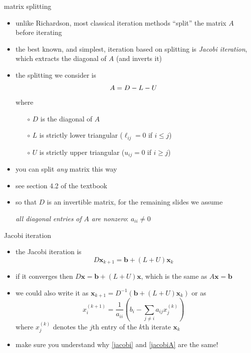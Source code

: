 \documentclass[10pt,hyperref]{beamer}
\newcommand{\bb}{\mathbf{b}}
\newcommand{\bx}{\mathbf{x}}
\begin{document}
\begin{frame}{matrix splitting}

\begin{itemize}
\item unlike Richardson, most classical iteration methods ``split'' the matrix $A$ before iterating
\item the best known, and simplest, iteration based on splitting is \emph{Jacobi iteration}, which extracts the diagonal of $A$ (and inverts it)
\item the splitting we consider is
    $$A = D - L - U \vspace{-3mm}$$
where
  \begin{itemize}
  \item[$\circ$] $D$ is the diagonal of $A$
  \item[$\circ$] $L$ is strictly lower triangular ($\ell_{ij} = 0$ if $i \le j$)
  \item[$\circ$] $U$ is strictly upper triangular ($u_{ij} = 0$ if $i \ge j$)
  \end{itemize}
\item you can split \emph{any} matrix this way
\item see section 4.2 of the textbook

\medskip
\item so that $D$ is an invertible matrix, for the remaining slides we assume

\centerline{\emph{all diagonal entries of $A$ are nonzero}: \quad  $a_{ii} \ne 0$}
\end{itemize}
\end{frame}


\begin{frame}{Jacobi iteration}

\begin{itemize}
\item the Jacobi iteration is
\begin{equation}
D \bx_{k+1} = \bb + (L + U) \bx_k  \label{jacobi}
\end{equation}
\item if it converges then $D\bx = \bb + (L+U)\bx$, which is the same as $A \bx = \bb$
\item we could also write it as \quad $\bx_{k+1} = D^{-1} \left(\bb + (L + U) \bx_k\right)$ \quad or as
\begin{equation}
x_i^{(k+1)} = \frac{1}{a_{ii}} \left(b_i - \sum_{j\ne i} a_{ij} x_j^{(k)}\right)  \label{jacobiA}
\end{equation}
where $x_j^{(k)}$ denotes the $j$th entry of the $k$th iterate $\bx_k$

\medskip
\item make sure you understand why \eqref{jacobi} and \eqref{jacobiA} are the same!
\end{itemize}
\end{frame}
\end{document}
